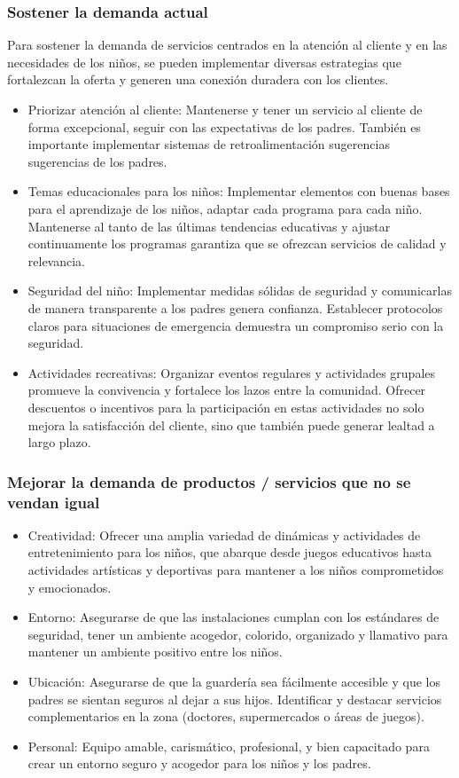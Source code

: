 \documentclass[letterpaper,12pt]{article}
\begin{document}
\begin{sloppypar}
\subsubsection{Sostener la demanda actual}
Para sostener la demanda de servicios centrados en la atención al cliente y en las necesidades de los niños, se pueden implementar diversas estrategias que fortalezcan la oferta y generen una conexión duradera con los clientes.
\begin{itemize}
  \item Priorizar atención al cliente: Mantenerse y tener un servicio al cliente de forma excepcional, seguir con las expectativas de los padres. También es importante implementar sistemas de retroalimentación sugerencias sugerencias de los padres. 
  \item Temas educacionales para los niños: Implementar elementos con buenas bases para el aprendizaje de los niños, adaptar cada programa para cada niño.  Mantenerse al tanto de las últimas tendencias educativas y ajustar continuamente los programas garantiza que se ofrezcan servicios de calidad y relevancia.
  \item Seguridad del niño: Implementar medidas sólidas de seguridad y comunicarlas de manera transparente a los padres genera confianza. Establecer protocolos claros para situaciones de emergencia demuestra un compromiso serio con la seguridad.
  \item Actividades recreativas: Organizar eventos regulares y actividades grupales promueve la convivencia y fortalece los lazos entre la comunidad. Ofrecer descuentos o incentivos para la participación en estas actividades no solo mejora la satisfacción del cliente, sino que también puede generar lealtad a largo plazo.
\end{itemize}

\subsubsection{Mejorar la demanda de productos / servicios que no se vendan igual}
\begin{itemize}
  \item Creatividad: Ofrecer una amplia variedad de dinámicas y actividades de entretenimiento para los niños, que abarque desde juegos educativos hasta actividades artísticas y deportivas para mantener a los niños comprometidos y emocionados.
  \item Entorno:  Asegurarse de que las instalaciones cumplan con los estándares de seguridad, tener un ambiente acogedor, colorido, organizado y llamativo para mantener un ambiente positivo entre los niños.
  \item Ubicación: Asegurarse de que la guardería sea fácilmente accesible y que los padres se sientan seguros al dejar a sus hijos. Identificar y destacar servicios complementarios en la zona (doctores, supermercados o áreas de juegos).
  \item Personal: Equipo amable, carismático, profesional, y bien capacitado para crear un entorno seguro y acogedor para los niños y los padres.
\end{itemize}
\newpage

\end{sloppypar}
\end{document}
